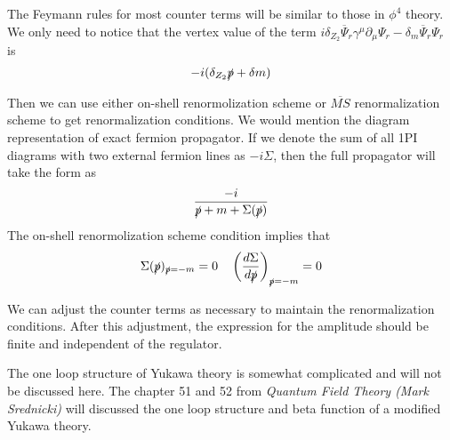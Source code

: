 The Feymann rules for most counter terms will be similar to those in $\phi^4$ theory. We only need to notice that the vertex value of the term  $i\delta_{Z_2}\overline{\Psi}_r \gamma^{\mu} \partial_{\mu} \Psi_r - \delta_m \overline{\Psi}_r \Psi_r $ is
\[-i(\delta_{Z_2} \slashed{p} + \delta m)\]

Then we can use either on-shell renormolization scheme or $\overline{MS}$ renormalization scheme to get renormalization conditions. 
We would mention the diagram representation of exact fermion propagator. If we denote the sum of all 1PI diagrams with two external fermion lines as $-i\Sigma$, then the full propagator will take the form as
\[\frac{-i}{\slashed{p}+m+\Sigma(\slashed{p})}\]
The on-shell renormolization scheme condition implies that
\[\Sigma(\slashed{p})_{\slashed{p}=-m} = 0 \quad \left(\frac{d\Sigma}{d\slashed{p}}\right)_{\slashed{p} = -m} = 0\]

We can adjust the counter terms as necessary to maintain the renormalization conditions. After this adjustment, the expression for the amplitude should be finite and independent of the regulator.

The one loop structure of Yukawa theory is somewhat complicated and will not be discussed here. The chapter 51 and 52 from \emph{Quantum Field Theory (Mark Srednicki)} will discussed the one loop structure and beta function of a modified Yukawa theory.